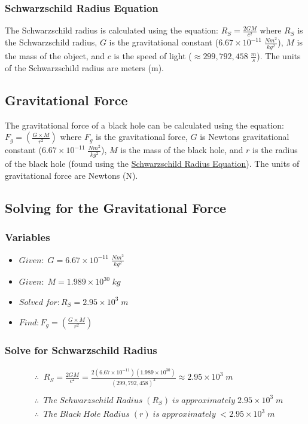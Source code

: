 \documentclass{article}
\begin{document}
\subsubsection{Schwarzschild Radius Equation}\label{sec:schwarzschild_radius_equation}
The Schwarzschild radius is calculated using the equation: $R_{S} = \frac{2GM}{c^2}$ where $R_{S}$ is the Schwarzschild radius, $G$ is the gravitational constant (\hyperref[sec:constants]{$6.67 \times 10^{-11}\;\frac{Nm^2}{kg^2}$}), $M$ is the mass of the object, and $c$ is the speed of light (\hyperref[sec:constants]{$\approx 299, 792, 458\;\frac{m}{s}$}). The units of the Schwarzschild radius are meters (m).

\subsection{Gravitational Force}
The gravitational force of a black hole can be calculated using the equation: $F_g = \left(\frac{G\times M}{r^2}\right)$ where $F_g$ is the gravitational force, $G$ is Newtons gravitational constant (\hyperref[sec:constants]{$6.67 \times 10^{-11}\;\frac{Nm^2}{kg^2}$}), $M$ is the mass of the black hole, and $r$ is the radius of the black hole (found using the \hyperref[sec:schwarzschild_radius_equation]{Schwarzschild Radius Equation}). The units of gravitational force are Newtons (N).

\subsection{Solving for the Gravitational Force}
\subsubsection{Variables}
\begin{itemize}
    \item $Given:\; G = 6.67 \times 10^{-11}\;\frac{Nm^2}{kg^2}$
    \item $Given:\; M = 1.989\times 10^{30}\;kg$
    \item $Solved\; for: R_S = 2.95 \times 10^{3}\;m$
    \item $Find: F_g = \left(\frac{G\times M}{r^2}\right)$
\end{itemize}\leavevmode

\subsubsection{Solve for Schwarzschild Radius}
\begin{align*}
     & \therefore\;\; R_{S} = \frac{2GM}{c^2} = \frac{2(6.67 \times 10^{-11})(1.989\times 10^{30})}{(299,792,458)^2} \approx 2.95 \times 10^{3} \;m \\\\
     & \therefore\;\; The\; Schwarzschild\; Radius\; (R_{S})\; is\; approximately\; 2.95 \times 10^{3} \;m                                          \\
     & \therefore\;\; The\; Black\; Hole\; Radius\; (r)\; is\; approximately\; < 2.95 \times 10^{3} \;m
\end{align*}\leavevmode
\end{document}
